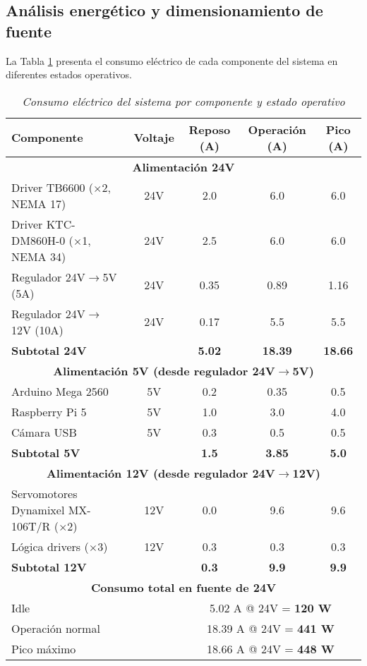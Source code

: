 \subsection{Análisis energético y dimensionamiento de fuente}

La Tabla \ref{tab:consumo_energetico} presenta el consumo eléctrico de cada componente del sistema en diferentes estados operativos.

\begin{table}[H]
\centering
\small
\begin{tabular}{|l|c|c|c|c|}
\hline
\textbf{Componente} & \textbf{Voltaje} & \textbf{Reposo (A)} & \textbf{Operación (A)} & \textbf{Pico (A)} \\
\hline
\multicolumn{5}{|c|}{\textbf{Alimentación 24V}} \\
\hline
Driver TB6600 ($\times$2, NEMA 17) & 24V & 2.0 & 6.0 & 6.0 \\
\hline
Driver KTC-DM860H-0 ($\times$1, NEMA 34) & 24V & 2.5 & 6.0 & 6.0 \\
\hline
Regulador 24V$\rightarrow$5V (5A)& 24V & 0.35 & 0.89 & 1.16 \\
\hline
Regulador 24V$\rightarrow$12V (10A)& 24V & 0.17 & 5.5 & 5.5 \\
\hline
\multicolumn{2}{|l|}{\textbf{Subtotal 24V}} & \textbf{5.02} & \textbf{18.39} & \textbf{18.66} \\
\hline
\hline
\multicolumn{5}{|c|}{\textbf{Alimentación 5V (desde regulador 24V$\rightarrow$5V)}} \\
\hline
Arduino Mega 2560 & 5V & 0.2 & 0.35 & 0.5 \\
\hline
Raspberry Pi 5 & 5V & 1.0 & 3.0 & 4.0 \\
\hline
Cámara USB & 5V & 0.3 & 0.5 & 0.5 \\
\hline
\multicolumn{2}{|l|}{\textbf{Subtotal 5V}} & \textbf{1.5} & \textbf{3.85} & \textbf{5.0} \\
\hline
\hline
\multicolumn{5}{|c|}{\textbf{Alimentación 12V (desde regulador 24V$\rightarrow$12V)}} \\
\hline
Servomotores Dynamixel MX-106T/R ($\times$2) & 12V & 0.0 & 9.6 & 9.6 \\
\hline
Lógica drivers ($\times$3) & 12V & 0.3 & 0.3 & 0.3 \\
\hline
\multicolumn{2}{|l|}{\textbf{Subtotal 12V}} & \textbf{0.3} & \textbf{9.9} & \textbf{9.9} \\
\hline
\hline
\multicolumn{5}{|c|}{\textbf{Consumo total en fuente de 24V}} \\
\hline
\multicolumn{2}{|l|}{Idle} & \multicolumn{3}{c|}{5.02 A @ 24V = \textbf{120 W}} \\
\hline
\multicolumn{2}{|l|}{Operación normal} & \multicolumn{3}{c|}{18.39 A @ 24V = \textbf{441 W}} \\
\hline
\multicolumn{2}{|l|}{Pico máximo} & \multicolumn{3}{c|}{18.66 A @ 24V = \textbf{448 W}} \\
\hline
\end{tabular}
\caption{\textit{Consumo eléctrico del sistema por componente y estado operativo}}
\label{tab:consumo_energetico}
\end{table}

